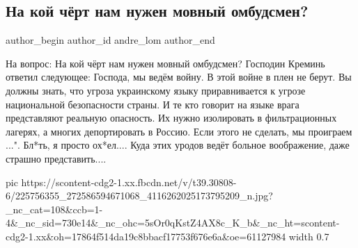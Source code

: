  
 
 
 
 
 
\subsection{На кой чёрт нам нужен мовный омбудсмен?}
\label{sec:06_08_2021.fb.andre_lom.1.mova_ombudsmen}
 
\ifcmt
 author_begin
   author_id andre_lom
 author_end
\fi

На вопрос: На кой чёрт нам нужен мовный омбудсмен? Господин Креминь ответил
следующее: Господа, мы ведём войну. В этой войне в плен не берут. Вы должны
знать, что угроза украинскому языку приравнивается к угрозе национальной
безопасности страны. И те кто говорит на языке врага представляют реальную
опасность. Их нужно изолировать в фильтрационных лагерях, а многих
депортировать в Россию. Если этого не сделать, мы проиграем ...". Бл*ть, я
просто ох*ел.... Куда этих уродов ведёт больное воображение, даже страшно
представить....

\ifcmt
  pic https://scontent-cdg2-1.xx.fbcdn.net/v/t39.30808-6/225756355_272586594671068_4116262025173795209_n.jpg?_nc_cat=108&ccb=1-4&_nc_sid=730e14&_nc_ohc=5sOr0qKstZ4AX8c_K_b&_nc_ht=scontent-cdg2-1.xx&oh=17864f514da19c8bbacf17753f676e6a&oe=61127984
  width 0.7
\fi


